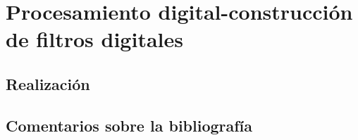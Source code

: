 \documentclass[oneside,a4paper,10pt]{scrbook}
\begin{document}
	\chapter{Procesamiento digital-construcción de filtros digitales}
	{	
		\section{Realización}
		{
			
		}
		
		\clearpage
		
		\section{Comentarios sobre la bibliografía}
		{
			
		}			
	}
	
	\clearpage
\end{document}
